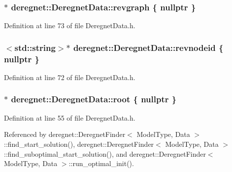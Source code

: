 \subsubsection[{\texorpdfstring{revgraph}{revgraph}}]{$\ast$ deregnet\+::\+Deregnet\+Data\+::revgraph \{ nullptr \}\hspace{0.3cm}{\ttfamily [private]}}\hypertarget{classderegnet_1_1DeregnetData_a4b6a17e13aeda78317ff37567e7fd26d}{}\label{classderegnet_1_1DeregnetData_a4b6a17e13aeda78317ff37567e7fd26d}


Definition at line 73 of file Deregnet\+Data.\+h.

\subsubsection[{\texorpdfstring{revnodeid}{revnodeid}}]{$<$std\+::string$>$$\ast$ deregnet\+::\+Deregnet\+Data\+::revnodeid \{ nullptr \}\hspace{0.3cm}{\ttfamily [private]}}\hypertarget{classderegnet_1_1DeregnetData_ad15bd1f0e5ab9d01b82b5c696203b855}{}\label{classderegnet_1_1DeregnetData_ad15bd1f0e5ab9d01b82b5c696203b855}


Definition at line 72 of file Deregnet\+Data.\+h.

\subsubsection[{\texorpdfstring{root}{root}}]{$\ast$ deregnet\+::\+Deregnet\+Data\+::root \{ nullptr \}}\hypertarget{classderegnet_1_1DeregnetData_a51a22fd88f929b1b1a00edb409b4cd55}{}\label{classderegnet_1_1DeregnetData_a51a22fd88f929b1b1a00edb409b4cd55}


Definition at line 55 of file Deregnet\+Data.\+h.



Referenced by deregnet\+::\+Deregnet\+Finder$<$ Model\+Type, Data $>$\+::find\+\_\+start\+\_\+solution(), deregnet\+::\+Deregnet\+Finder$<$ Model\+Type, Data $>$\+::find\+\_\+suboptimal\+\_\+start\+\_\+solution(), and deregnet\+::\+Deregnet\+Finder$<$ Model\+Type, Data $>$\+::run\+\_\+optimal\+\_\+init().

